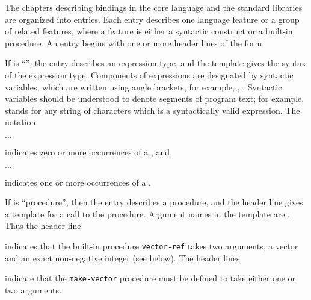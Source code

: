 The chapters describing bindings in the core language and the standard
libraries are organized
into entries.  Each entry describes one language feature or a group of
related features, where a feature is either a syntactic construct or a
built-in procedure.  An entry begins with one or more header lines of the form

\noindent{}\unpenalty

If  is ``\exprtype'', the entry describes an expression
type, and the template gives the syntax of the expression type.
Components of expressions are designated by syntactic variables, which
are written using angle brackets, for example, ,
.  Syntactic variables should be understood to denote segments of
program text; for example,  stands for any string of
characters which is a syntactically valid expression.  The notation
\begin{tabbing}
\qquad {} $\ldots$
\end{tabbing}
indicates zero or more occurrences of a , and
\begin{tabbing}
\qquad {}  $\ldots$
\end{tabbing}
indicates one or more occurrences of a .

If  is ``procedure'', then the entry describes a procedure, and
the header line gives a template for a call to the procedure.  Argument
names in the template are .  Thus the header line

\noindent{}\unpenalty

indicates that the built-in procedure {\tt vector-ref} takes
two arguments, a vector  and an exact non-negative integer
 (see below).  The header lines

\noindent%
\unpenalty

indicate that the {\tt make-vector} procedure must be defined to take
either one or two arguments.

